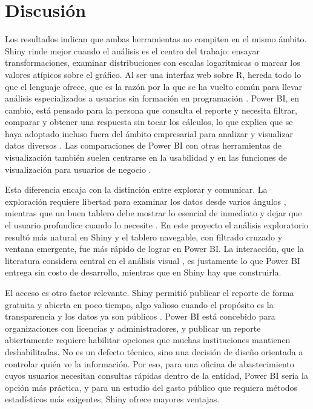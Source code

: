 \documentclass[12pt,a4paper]{article}
\begin{document}
\section{Discusión}
Los resultados indican que ambas herramientas no compiten en el mismo ámbito. Shiny rinde mejor cuando el
análisis es el centro del trabajo: ensayar transformaciones, examinar distribuciones con escalas logarítmicas o
marcar los valores atípicos sobre el gráfico. Al ser una interfaz web sobre R, hereda todo lo que el
lenguaje ofrece, que es la razón por la que se ha vuelto común para llevar análisis especializados a
usuarios sin formación en programación \citep{jia2022}. Power BI, en cambio, está pensado para la persona
que consulta el reporte y necesita filtrar, comparar y obtener una respuesta sin tocar los cálculos, lo
que explica que se haya adoptado incluso fuera del ámbito empresarial para analizar y visualizar datos
diversos \citep{becker2019}. Las comparaciones de Power BI con otras herramientas de visualización también
suelen centrarse en la usabilidad y en las funciones de visualización para usuarios de negocio
\citep{sahaya2024}.

Esta diferencia encaja con la distinción entre explorar y comunicar. La exploración requiere libertad para
examinar los datos desde varios ángulos \citep{behrens1997}, mientras que un buen tablero debe mostrar lo
esencial de inmediato y dejar que el usuario profundice cuando lo necesite
\citep{shneiderman1996,yigitbasioglu2012}. En este proyecto el análisis exploratorio resultó más natural en
Shiny y el tablero navegable, con filtrado cruzado y ventana emergente, fue más rápido de lograr en Power
BI. La interacción, que la literatura considera central en el análisis visual \citep{heer2012}, es
justamente lo que Power BI entrega sin costo de desarrollo, mientras que en Shiny hay que construirla.

El acceso es otro factor relevante. Shiny permitió publicar el reporte de forma gratuita y abierta en poco tiempo, algo
valioso cuando el propósito es la transparencia y los datos ya son públicos \citep{janssen2012}. Power BI
está concebido para organizaciones con licencias y administradores, y publicar un reporte abiertamente
requiere habilitar opciones que muchas instituciones mantienen deshabilitadas. No es un defecto técnico, sino una
decisión de diseño orientada a controlar quién ve la información. Por eso, para una oficina de
abastecimiento cuyos usuarios necesitan consultas rápidas dentro de la entidad, Power BI sería la opción más
práctica, y para un estudio del gasto público que requiera métodos estadísticos más exigentes, Shiny ofrece
mayores ventajas.
\end{document}
